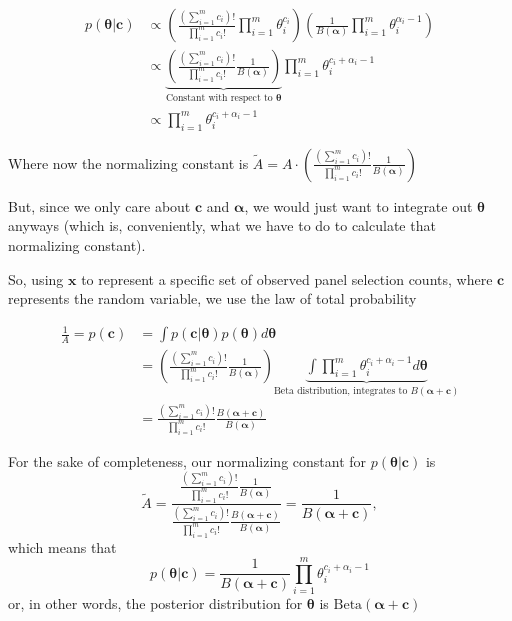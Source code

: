 \documentclass{article}
\begin{document}
\begin{align*}
p(\bm\theta | \bm c) &\propto \left(\frac{\left(\sum_{i=1}^m c_i\right)!}{\prod_{i=1}^m c_i!}\prod_{i=1}^m\theta_i^{c_i}\right)\left(\frac{1}{B(\bm\alpha)}\prod_{i=1}^m\theta_i^{\alpha_i - 1}\right) \\
&\propto\underbrace{ \left(\frac{\left(\sum_{i=1}^m c_i\right)!}{\prod_{i=1}^m c_i!}\frac{1}{B(\bm\alpha)}\right)}_{\text{Constant with respect to }\bm\theta}\prod_{i=1}^m \theta_i^{c_i + \alpha_i - 1}\\
&\propto \prod_{i=1}^m \theta_i^{c_i + \alpha_i - 1} 
\end{align*}

Where now the normalizing constant is $\tilde A = A \cdot \left(\frac{\left(\sum_{i=1}^m c_i\right)!}{\prod_{i=1}^m c_i!}\frac{1}{B(\bm\alpha)}\right)$

But, since we only care about $\bm c$ and $\bm \alpha$, we would just want to integrate out $\bm\theta$ anyways (which is, conveniently, what we have to do to calculate that normalizing constant). 

So, using $\bm x$ to represent a specific set of observed panel selection counts, where $\bm c$ represents the random variable, we use the law of total probability

\begin{align*}
\frac{1}{A} = p(\bm c) & = \int p(\bm c | \bm\theta) p(\bm\theta) d\bm\theta\\
&=\left(\frac{\left(\sum_{i=1}^m c_i\right)!}{\prod_{i=1}^m c_i!}\frac{1}{B(\bm\alpha)}\right) \underbrace{\int \prod_{i=1}^m \theta_i^{c_i + \alpha_i - 1}d\bm\theta}_{\text{Beta distribution, integrates to }B(\bm\alpha + \bm c)}\\
&= \frac{\left(\sum_{i=1}^m c_i\right)!}{\prod_{i=1}^m c_i!}\frac{B(\bm\alpha + \bm c)}{B(\bm\alpha)}
\end{align*}

For the sake of completeness, our normalizing constant for $p(\bm\theta | \bm c)$ is $$\tilde A = \frac{\frac{\left(\sum_{i=1}^m c_i\right)!}{\prod_{i=1}^m c_i!}\frac{1}{B(\bm\alpha)}}{\frac{\left(\sum_{i=1}^m c_i\right)!}{\prod_{i=1}^m c_i!}\frac{B(\bm\alpha + \bm c)}{B(\bm\alpha)}} = \frac{1}{B(\bm \alpha + \bm c)},$$
which means that $$p(\bm\theta | \bm c) = \frac{1}{B(\bm \alpha + \bm c)} \prod_{i=1}^m \theta_i^{c_i + \alpha_i - 1}$$
or, in other words, the posterior distribution for $\bm\theta$ is $\text{Beta}(\bm\alpha + \bm c)$
\end{document}
